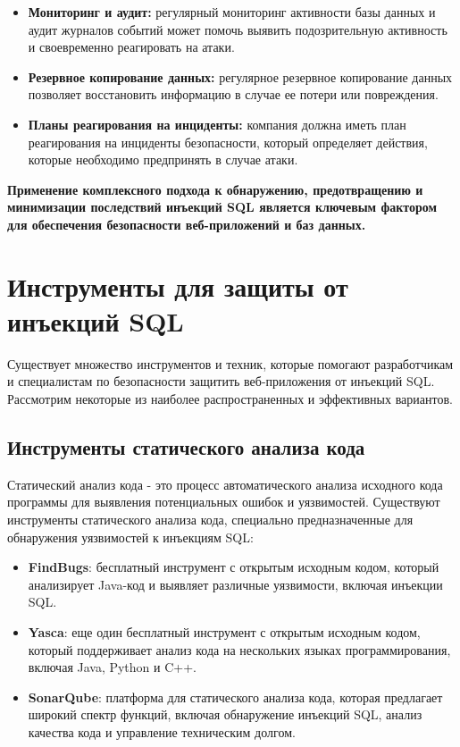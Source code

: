 \documentclass[a4paper,12pt]{diplom}
\begin{document}
	 \begin{itemize}
	 	\item \textbf{Мониторинг и аудит:} регулярный мониторинг активности базы данных и аудит журналов событий может помочь выявить подозрительную активность и своевременно реагировать на атаки. 
	 	\item \textbf{Резервное копирование данных:} регулярное резервное копирование данных позволяет восстановить информацию в случае ее потери или повреждения. 
	 	\item \textbf{Планы реагирования на инциденты:} компания должна иметь план реагирования на инциденты безопасности, который определяет действия, которые необходимо предпринять в случае атаки. 
	 \end{itemize}
	 
	 \textbf{Применение комплексного подхода к обнаружению, предотвращению и минимизации последствий инъекций SQL является ключевым фактором для обеспечения безопасности веб-приложений и баз данных.} 
	 
	 
	 
	 
	 
	 
	 
	 
	 \section{Инструменты для защиты от инъекций SQL}
	 
	 Существует множество инструментов и техник, которые помогают разработчикам и специалистам по безопасности защитить веб-приложения от инъекций SQL.  Рассмотрим некоторые из наиболее распространенных и эффективных вариантов.
	 
	 \subsection{Инструменты статического анализа кода}
	 
	 Статический анализ кода - это процесс автоматического анализа исходного кода программы для выявления потенциальных ошибок и уязвимостей.  Существуют инструменты статического анализа кода,  специально предназначенные для обнаружения уязвимостей к инъекциям SQL:
	 
	 \begin{itemize}
	 	\item \textbf{FindBugs}:  бесплатный инструмент с открытым исходным кодом, который анализирует Java-код и выявляет различные уязвимости,  включая инъекции SQL. \cite{FindBugs_tool}
	 	\item \textbf{Yasca}:  еще один бесплатный инструмент с открытым исходным кодом, который поддерживает анализ кода на нескольких языках программирования,  включая Java,  Python и C++. \cite{Yasca_tool}
	 	\item \textbf{SonarQube}:  платформа для статического анализа кода,  которая предлагает широкий спектр функций,  включая обнаружение инъекций SQL,  анализ качества кода и управление техническим долгом. \cite{SonarQube_tool}
	 \end{itemize}
	 
\end{document}
